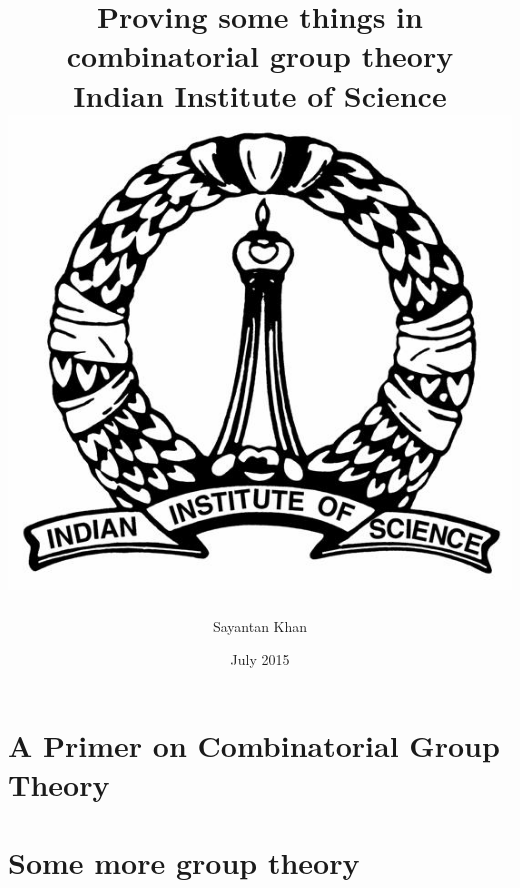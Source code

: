 \documentclass[12pt]{report}
\title{
	{Proving some things in combinatorial group theory}\\
	{\large Indian Institute of Science}\\
	{\includegraphics[scale=0.5]{IIsc_logo.jpg}}
}
\author{Sayantan Khan}
\date{July 2015}
\theoremstyle{definition}
\begin{document}
\maketitle

\tableofcontents

\chapter{A Primer on Combinatorial Group Theory}


\chapter{Some more group theory}




\end{document}

